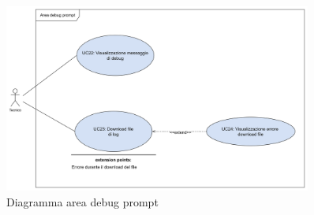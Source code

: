 \begin{figure}[H]
  \centering
  \includegraphics[width=0.90\textwidth]{assets/debug.png}
  \caption{Diagramma area debug prompt}
\end{figure}

















